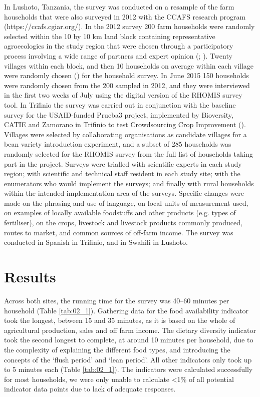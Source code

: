 In Lushoto, Tanzania, the survey was conducted on a resample of the farm households that were also surveyed in 2012 with the CCAFS research program (https://ccafs.cgiar.org/). In the 2012 survey 200 farm households were randomly selected within the 10 by 10 km land block containing representative agroecologies in the study region that were chosen through a participatory process involving a wide range of partners and expert opinion (\citealp{Kristjanson2012381}; \citealp{Förch2014}). Twenty villages within each block, and then 10 households on average within each village were randomly chosen (\citealp{Kristjanson2012381}) for the household survey. In June 2015 150 households were randomly chosen from the 200 sampled in 2012, and they were interviewed in the ﬁrst two weeks of July using the digital version of the RHOMIS survey tool. In Triﬁnio the survey was carried out in conjunction with the baseline survey for the USAID-funded Prueba3 project, implemented by Bioversity, CATIE and Zamorano in Triﬁnio to test Crowdsourcing Crop Improvement (\citealp{VanEtten2011102}). Villages were selected by collaborating organisations as candidate villages for a bean variety introduction experiment, and a subset of 285 households was randomly selected for the RHOMIS survey from the full list of households taking part in the project. Surveys were trialled with scientiﬁc experts in each study region; with scientiﬁc and technical staff resident in each study site; with the enumerators who would implement the surveys; and ﬁnally with rural households within the intended implementation area of the surveys. Speciﬁc changes were made on the phrasing and use of language, on local units of measurement used, on examples of locally available foodstuffs and other products (e.g. types of fertiliser), on the crops, livestock and livestock products commonly produced, routes to market, and common sources of off-farm income. The survey was conducted in Spanish in Triﬁnio, and in Swahili in Lushoto.

\section{Results}

Across both sites, the running time for the survey was 40–60 minutes per household (Table \ref{tab:02_1}). Gathering data for the food availability indicator took the longest, between 15 and 35 minutes, as it is based on the whole of agricultural production, sales and off farm income. The dietary diversity indicator took the second longest to complete, at around 10 minutes per household, due to the complexity of explaining the different food types, and introducing the concepts of the `flush period' and `lean period'. All other indicators only took up to 5 minutes each (Table \ref{tab:02_1}). The indicators were calculated successfully for most households, we were only unable to calculate \textless1\% of all potential indicator data points due to lack of adequate responses.

